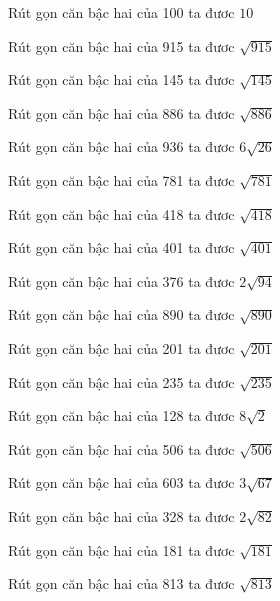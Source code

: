 \documentclass[12pt,a4paper]{article}
\begin{document}
\begin{ex}
Rút gọn căn bậc hai của 100 ta đươc $10$
\end{ex}
\begin{ex}
Rút gọn căn bậc hai của 915 ta đươc $\sqrt{915}$
\end{ex}
\begin{ex}
Rút gọn căn bậc hai của 145 ta đươc $\sqrt{145}$
\end{ex}
\begin{ex}
Rút gọn căn bậc hai của 886 ta đươc $\sqrt{886}$
\end{ex}
\begin{ex}
Rút gọn căn bậc hai của 936 ta đươc $6\sqrt{26}$
\end{ex}
\begin{ex}
Rút gọn căn bậc hai của 781 ta đươc $\sqrt{781}$
\end{ex}
\begin{ex}
Rút gọn căn bậc hai của 418 ta đươc $\sqrt{418}$
\end{ex}
\begin{ex}
Rút gọn căn bậc hai của 401 ta đươc $\sqrt{401}$
\end{ex}
\begin{ex}
Rút gọn căn bậc hai của 376 ta đươc $2\sqrt{94}$
\end{ex}
\begin{ex}
Rút gọn căn bậc hai của 890 ta đươc $\sqrt{890}$
\end{ex}
\begin{ex}
Rút gọn căn bậc hai của 201 ta đươc $\sqrt{201}$
\end{ex}
\begin{ex}
Rút gọn căn bậc hai của 235 ta đươc $\sqrt{235}$
\end{ex}
\begin{ex}
Rút gọn căn bậc hai của 128 ta đươc $8\sqrt{2}$
\end{ex}
\begin{ex}
Rút gọn căn bậc hai của 506 ta đươc $\sqrt{506}$
\end{ex}
\begin{ex}
Rút gọn căn bậc hai của 603 ta đươc $3\sqrt{67}$
\end{ex}
\begin{ex}
Rút gọn căn bậc hai của 328 ta đươc $2\sqrt{82}$
\end{ex}
\begin{ex}
Rút gọn căn bậc hai của 181 ta đươc $\sqrt{181}$
\end{ex}
\begin{ex}
Rút gọn căn bậc hai của 813 ta đươc $\sqrt{813}$
\end{ex}
\end{document}
